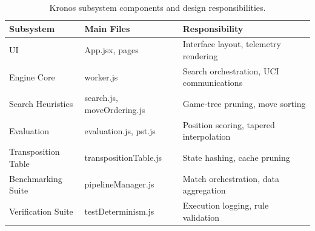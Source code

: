 \begin{table}[htbp]
\centering
\caption[Kronos Subsystem Mappings and Responsibilities]{Kronos subsystem components and design responsibilities.}
\label{tab:subsystems_summary}
\begin{tabularx}{\textwidth}{llX}
\toprule
\textbf{Subsystem} & \textbf{Main Files} & \textbf{Responsibility} \\
\midrule
UI & App.jsx, pages & Interface layout, telemetry rendering \\
Engine Core & worker.js & Search orchestration, UCI communications \\
Search Heuristics & search.js, moveOrdering.js & Game-tree pruning, move sorting \\
Evaluation & evaluation.js, pst.js & Position scoring, tapered interpolation \\
Transposition Table & transpositionTable.js & State hashing, cache pruning \\
Benchmarking Suite & pipelineManager.js & Match orchestration, data aggregation \\
Verification Suite & testDeterminism.js & Execution logging, rule validation \\
\bottomrule
\end{tabularx}
\end{table}
